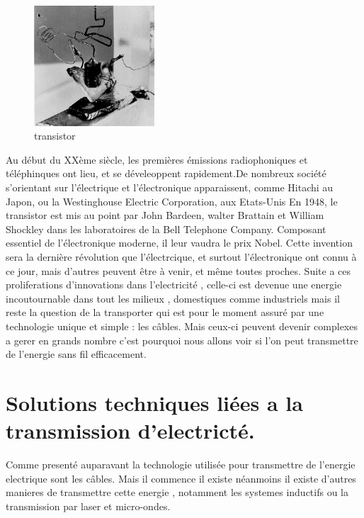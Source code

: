 \documentclass[12pt]{report}
\begin{document}
\begin{figure}
  \begin{center}
    \includegraphics[width=0.4\textwidth]{transistor}
  \end{center}
  \caption{transistor}
\end{figure} Au début du XXème siècle, les premières émissions radiophoniques et téléphinques ont lieu, et se déveleoppent rapidement.De nombreux société s'orientant sur l'électrique et l'électronique apparaissent, comme Hitachi au Japon, ou la Westinghouse Electric Corporation, aux Etats-Unis
En 1948, le transistor est mis au point par John Bardeen, walter Brattain et William Shockley dans les laboratoires de la Bell Telephone Company. Composant essentiel de l'électronique moderne, il leur vaudra le prix Nobel.
Cette invention sera la dernière révolution que l'électrcique, et surtout l'électronique ont connu à ce jour, mais d'autres peuvent être à venir, et même toutes proches. Suite a ces proliferations d'innovations dans l'electricité , celle-ci est devenue une energie incoutournable dans tout les milieux , domestiques comme industriels mais il reste la question de la transporter qui est pour le moment assuré par une technologie unique et simple : les câbles. Mais ceux-ci peuvent devenir complexes a gerer en grands nombre c'est pourquoi nous allons voir si l'on peut transmettre de l'energie sans fil efficacement.

\chapter{Solutions techniques liées a la transmission d'electricté.}
  Comme presenté auparavant la technologie utilisée pour transmettre de l'energie electrique sont les câbles. Mais il commence il existe néanmoins il existe d'autres manieres de transmettre cette energie , notamment les systemes inductifs ou la transmission par laser et micro-ondes.
\end{document}
